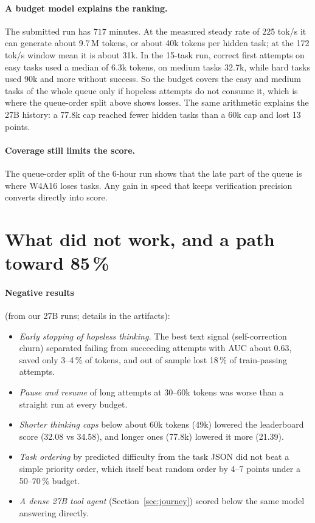 \documentclass[11pt]{article}
\begin{document}
\paragraph{A budget model explains the ranking.} The submitted run has $717$ minutes. At the measured steady rate of 225 tok/s it can generate about 9.7\,M tokens, or about 40k tokens per hidden task; at the 172 tok/s window mean it is about 31k. In the 15-task run, correct first attempts on easy tasks used a median of 6.3k tokens, on medium tasks 32.7k, while hard tasks used 90k and more without success. So the budget covers the easy and medium tasks of the whole queue only if hopeless attempts do not consume it, which is where the queue-order split above shows losses. The same arithmetic explains the 27B history: a 77.8k cap reached fewer hidden tasks than a 60k cap and lost 13 points.

\paragraph{Coverage still limits the score.} The queue-order split of the 6-hour run shows that the late part of the queue is where W4A16 loses tasks. Any gain in speed that keeps verification precision converts directly into score.

\section{What did not work, and a path toward 85\,\%}\label{sec:progress}
\paragraph{Negative results} (from our 27B runs; details in the artifacts):
\begin{itemize}
\item \emph{Early stopping of hopeless thinking.} The best text signal (self-correction churn) separated failing from succeeding attempts with AUC about 0.63, saved only 3--4\,\% of tokens, and out of sample lost 18\,\% of train-passing attempts.
\item \emph{Pause and resume} of long attempts at 30--60k tokens was worse than a straight run at every budget.
\item \emph{Shorter thinking caps} below about 60k tokens (49k) lowered the leaderboard score (32.08 vs 34.58), and longer ones (77.8k) lowered it more (21.39).
\item \emph{Task ordering} by predicted difficulty from the task JSON did not beat a simple priority order, which itself beat random order by 4--7 points under a 50--70\,\% budget.
\item \emph{A dense 27B tool agent} (Section~\ref{sec:journey}) scored below the same model answering directly.
\end{itemize}
\end{document}
